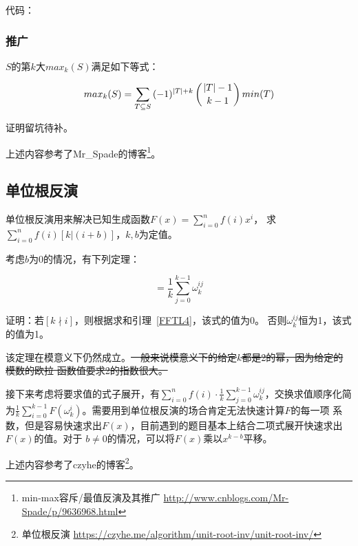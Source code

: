 代码：


\subsubsection{推广}
$S$的第$k$大$max_k(S)$满足如下等式：

\begin{displaymath}
	max_k(S)=\sum_{T\subseteq S}{(-1)^{|T|+k}\left(|T|-1 \atop k-1\right)min(T)}
\end{displaymath}

证明留坑待补。

上述内容参考了Mr\_Spade的博客\footnote{
	min-max容斥/最值反演及其推广
	\url{http://www.cnblogs.com/Mr-Spade/p/9636968.html}
}。
\subsection{单位根反演}
单位根反演用来解决已知生成函数$F(x)=\displaystyle \sum_{i=0}^n{f(i)x^i}$，
求$\displaystyle \sum_{i=0}^n{f(i)[k|(i+b)]}$，$k,b$为定值。

考虑$b$为0的情况，有下列定理：
\begin{theorem}
	\begin{displaymath}
		[k|i]=\frac{1}{k}\sum_{j=0}^{k-1}{\omega_k^{ij}}
	\end{displaymath}
\end{theorem}

证明：若$[k\nmid i]$，则根据求和引理~\ref{FFTL4}，该式的值为0。
否则$\omega_k^{ij}$恒为1，该式的值为1。

该定理在模意义下仍然成立。\sout{一般来说模意义下的给定$k$都是2的幂，因为给定的模数的欧拉
函数值要求2的指数很大。}

接下来考虑将要求值的式子展开，有$\displaystyle \sum_{i=0}^n{f(i)\cdot \frac{1}{k}
\sum_{j=0}^{k-1}{\omega_k^{ij}}}$，交换求值顺序化简为$\frac{1}{k}\displaystyle
\sum_{i=0}^{k-1}{F(\omega_k^i)}$。需要用到单位根反演的场合肯定无法快速计算$F$的每一项
系数，但是容易快速求出$F(x)$，目前遇到的题目基本上结合二项式展开快速求出$F(x)$的值。对于
$b\neq 0$的情况，可以将$F(x)$乘以$x^{k-b}$平移。

上述内容参考了czyhe的博客\footnote{
	单位根反演
\url{https://czyhe.me/algorithm/unit-root-inv/unit-root-inv/}}。
